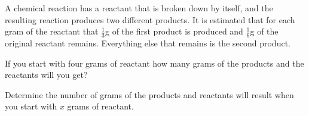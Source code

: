 
\begin{problem}
\item A chemical reaction has a reactant that is broken down by
  itself, and the resulting reaction produces two different
  products. It is estimated that for each gram of the reactant that
  $\frac{1}{3}$g of the first product is produced and $\frac{1}{6}$g
  of the original reactant remains. Everything else that remains is
  the second product.
  \begin{subproblem}
  \item If you start with four grams of reactant how many grams of the
    products and the reactants will you get?
    \vfill
  \item Determine the number of grams of the products and reactants
    will result when you start with  $x$ grams of reactant.
    \vfill
  \end{subproblem}
\end{problem}


